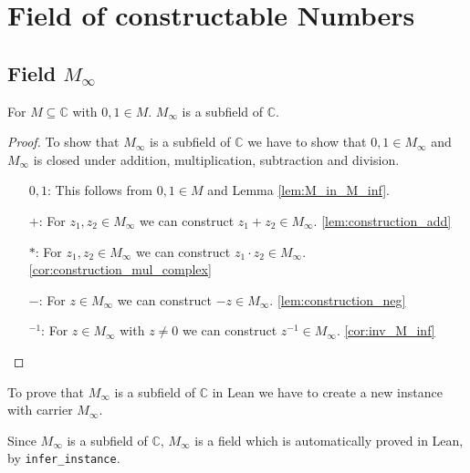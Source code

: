 \chapter{Field of constructable Numbers}
\section[Filed of Constructable Numbers]{Field $M_{\infty}$}
\begin{theorem}
    \label{thm:MField}
    \leanok
    For $M\subseteq \mathbb{C}$ with $0,1 \in M$. $M_{\infty}$ is a subfield of $\mathbb{C}$.
\end{theorem}
\begin{proof}
    To show that $M_{\infty}$ is a subfield of $\mathbb{C}$ we have to show that $0,1\in M_{\infty}$ and $M_{\infty}$ is closed under addition, multiplication, subtraction and division.
    \begin{itemize}
        \item [$0,1$:] This follows from $0,1 \in M$ and Lemma \ref{lem:M_in_M_inf}.
        \item [$+$:] For $z_1,z_2 \in M_{\infty}$ we can construct $z_1 + z_2 \in M_{\infty}$. \ref{lem:construction_add}
        \item [$*$:] For $z_1,z_2 \in M_{\infty}$ we can construct $z_1 \cdot z_2 \in M_{\infty}$. \ref{cor:construction_mul_complex}
        \item [$-$:] For $z \in M_{\infty}$ we can construct $-z \in M_{\infty}$. \ref{lem:construction_neg}
        \item [$^{-1}$:] For $z \in M_{\infty}$ with $z \ne 0$ we can construct $z^{-1} \in M_{\infty}$. \ref{cor:inv_M_inf}
    \end{itemize}
\end{proof}

\begin{remark}
   To prove that $M_{\infty}$ is a subfield of $\mathbb{C}$ in Lean we have to create a new instance with carrier $M_{\infty}$.
\end{remark}
\begin{remark}
    \label{rem:MField_Field}
    Since $M_{\infty}$ is a subfield of $\mathbb{C}$, $M_{\infty}$ is a field which is automatically proved in Lean, by \lstinline{infer_instance}.
\end{remark}


